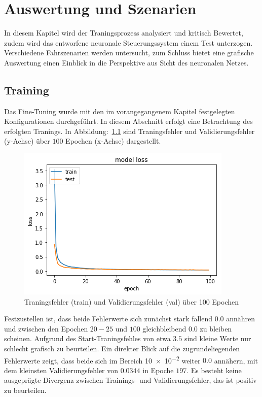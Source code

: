 %
\chapter{Auswertung und Szenarien}
In diesem Kapitel wird der Traningsprozess analysiert und kritisch Bewertet, zudem wird das entworfene neuronale Steuerungssystem einem Test unterzogen. Verschiedene Fahrszenarien werden untersucht, zum Schluss bietet eine grafische Auswertung einen Einblick in die Perspektive aus Sicht des neuronalen Netzes.

\section{Training}
Das Fine-Tuning wurde mit den im vorangegangenem Kapitel festgelegten Konfigurationen durchgeführt. In diesem Abschnitt erfolgt eine Betrachtung des erfolgten Tranings. In Abbildung:~\ref{img:loss} sind Traningsfehler und Validierungsfehler (y-Achse) über $100$ Epochen (x-Achse) dargestellt. 

\begin{figure}[h]
	\centering
	\includegraphics[scale=0.7]{figures/loss.png}
	\caption{Traningsfehler (train) und Validierungsfehler (val) über 100 Epochen}
	\label{img:loss}
\end{figure}

Festzustellen ist, dass beide Fehlerwerte sich zunächst stark fallend $0.0$ annähren und zwischen den Epochen $20-25$ und $100$ gleichbleibend $0.0$ zu bleiben scheinen. Aufgrund des Start-Traningsfehles von etwa $3.5$ sind kleine Werte nur schlecht grafisch zu beurteilen. Ein direkter Blick auf die zugrundeliegenden Fehlerwerte zeigt, dass beide sich im Bereich \num{10e-2} weiter $0.0$ annähern, mit dem kleinsten Validierungsfehler von $0.0344$ in Epoche $197$. Es besteht keine ausgeprägte Divergenz zwischen Trainings- und Validierungsfehler, das ist positiv zu beurteilen.

